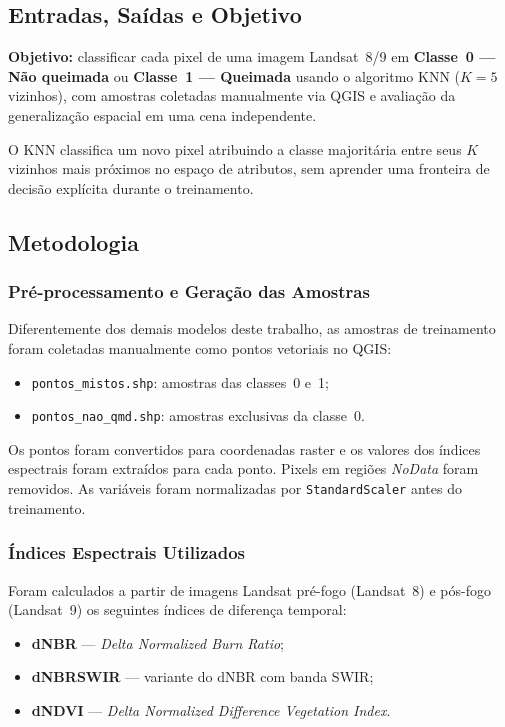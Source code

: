 \documentclass[conference]{IEEEtran}
\begin{document}
\subsection{Entradas, Saídas e Objetivo}

\textbf{Objetivo:} classificar cada pixel de uma imagem Landsat~8/9 em
\textbf{Classe~0 — Não queimada} ou \textbf{Classe~1 — Queimada} usando o
algoritmo KNN ($K = 5$ vizinhos), com amostras coletadas manualmente via QGIS
e avaliação da generalização espacial em uma cena independente.

O KNN classifica um novo pixel atribuindo a classe majoritária entre seus
$K$ vizinhos mais próximos no espaço de atributos, sem aprender uma
fronteira de decisão explícita durante o treinamento.

\subsection{Metodologia}

\subsubsection{Pré-processamento e Geração das Amostras}

Diferentemente dos demais modelos deste trabalho, as amostras de
treinamento foram coletadas manualmente como pontos vetoriais no QGIS:

\begin{itemize}
  \item \texttt{pontos\_mistos.shp}: amostras das classes~0 e~1;
  \item \texttt{pontos\_nao\_qmd.shp}: amostras exclusivas da classe~0.
\end{itemize}

Os pontos foram convertidos para coordenadas raster e os valores dos
índices espectrais foram extraídos para cada ponto. Pixels em regiões
\textit{NoData} foram removidos. As variáveis foram normalizadas por
\texttt{StandardScaler} antes do treinamento.

\subsubsection{Índices Espectrais Utilizados}

Foram calculados a partir de imagens Landsat pré-fogo (Landsat~8) e
pós-fogo (Landsat~9) os seguintes índices de diferença temporal:

\begin{itemize}
  \item \textbf{dNBR} — \textit{Delta Normalized Burn Ratio};
  \item \textbf{dNBRSWIR} — variante do dNBR com banda SWIR;
  \item \textbf{dNDVI} — \textit{Delta Normalized Difference Vegetation Index}.
\end{itemize}
\end{document}
